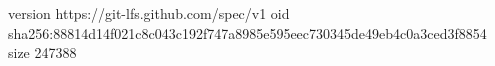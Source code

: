 version https://git-lfs.github.com/spec/v1
oid sha256:88814d14f021c8c043c192f747a8985e595eec730345de49eb4c0a3ced3f8854
size 247388
